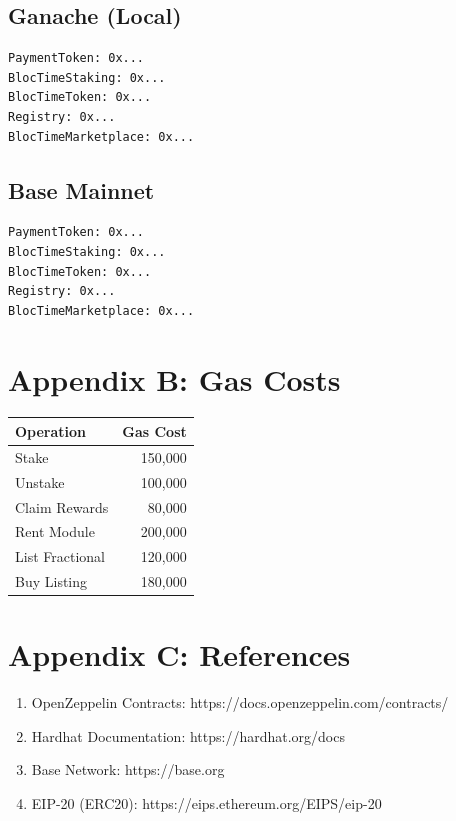 \documentclass[12pt,a4paper]{article}
\begin{document}
\subsection{Ganache (Local)}

\begin{lstlisting}
PaymentToken: 0x...
BlocTimeStaking: 0x...
BlocTimeToken: 0x...
Registry: 0x...
BlocTimeMarketplace: 0x...
\end{lstlisting}

\subsection{Base Mainnet}

\begin{lstlisting}
PaymentToken: 0x...
BlocTimeStaking: 0x...
BlocTimeToken: 0x...
Registry: 0x...
BlocTimeMarketplace: 0x...
\end{lstlisting}

\section{Appendix B: Gas Costs}

\begin{center}
\begin{tabular}{|l|r|}
\hline
\textbf{Operation} & \textbf{Gas Cost} \\
\hline
Stake & ~150,000 \\
Unstake & ~100,000 \\
Claim Rewards & ~80,000 \\
Rent Module & ~200,000 \\
List Fractional & ~120,000 \\
Buy Listing & ~180,000 \\
\hline
\end{tabular}
\end{center}

\section{Appendix C: References}

\begin{enumerate}
    \item OpenZeppelin Contracts: https://docs.openzeppelin.com/contracts/
    \item Hardhat Documentation: https://hardhat.org/docs
    \item Base Network: https://base.org
    \item EIP-20 (ERC20): https://eips.ethereum.org/EIPS/eip-20
\end{enumerate}
\end{document}
